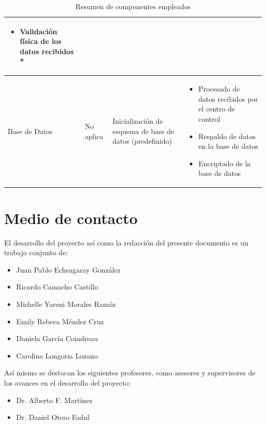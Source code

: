 \documentclass{article}
\begin{document}
\begin{table}[htbp]
{\begin{tabular}{| m{2cm} | m{3cm} | m{5cm} | m{9cm} |}
\begin{itemize}[noitemsep]
                        \item Validación física de los datos recibidos *
                    \end{itemize} \\
                    \hline
                    Base de Datos &
                    No aplica &
                    Inicialización de esquema de base de datos (predefinido) &
                    \begin{itemize}[noitemsep]
                        \item Procesado de datos recibidos por el centro de control
                        \item Respaldo de datos en la base de datos
                        \item Encriptado de la base de datos
                    \end{itemize} \\
                    \hline
                \end{tabular}}
                \label{tab:component_summary}
                \caption{Resumen de componentes empleados}
            \end{table}

    \section{Medio de contacto}\label{sec:contact}

        El desarrollo del proyecto así como la redacción del presente documento es un trabajo conjunto de:
        \begin{itemize}
            \item Juan Pablo Echeagaray González
            \item Ricardo Camacho Castillo
            \item Michelle Yareni Morales Ramóz
            \item Emily Rebeca Méndez Cruz
            \item Daniela García Coindreau
            \item Carolina Longoria Lozano
        \end{itemize}

        Así mismo se destacan los siguientes profesores, como asesores y supervisores de los avances en el desarrollo del proyecto:
        \begin{itemize}
            \item Dr. Alberto F. Martínez
            \item Dr. Daniel Otero Fadul
        \end{itemize}
\end{document}
